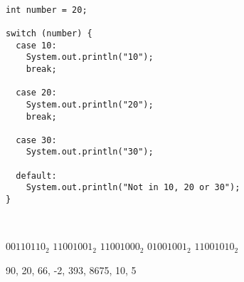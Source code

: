 \documentclass[11pt,addpoints]{exam}
\begin{document}
\begin{questions}
\begin{minipage}{\textwidth}
\begin{choices}
   \\
\end{choices}
\end{minipage}

\begin{minipage}{\textwidth}

\begin{verbatim}
int number = 20;

switch (number) {
  case 10:
    System.out.println("10");
    break;

  case 20:
    System.out.println("20");
    break;

  case 30:
    System.out.println("30");

  default:
    System.out.println("Not in 10, 20 or 30");
}
\end{verbatim}

\begin{choices}
   \\
\end{choices}

\end{minipage}

\begin{minipage}{\textwidth}

\begin{choices}
  \choice $00110110_{2}$
  \choice $11001001_{2}$
  \choice $11001000_{2}$
  \choice $01001001_{2}$
  \choice $11001010_{2}$ \\ %
\end{choices}
\end{minipage}

\begin{minipage}{\textwidth}

90, 20, 66, -2, 393, 8675, 10, 5 \\


\end{minipage}
\end{questions}
\end{document}

